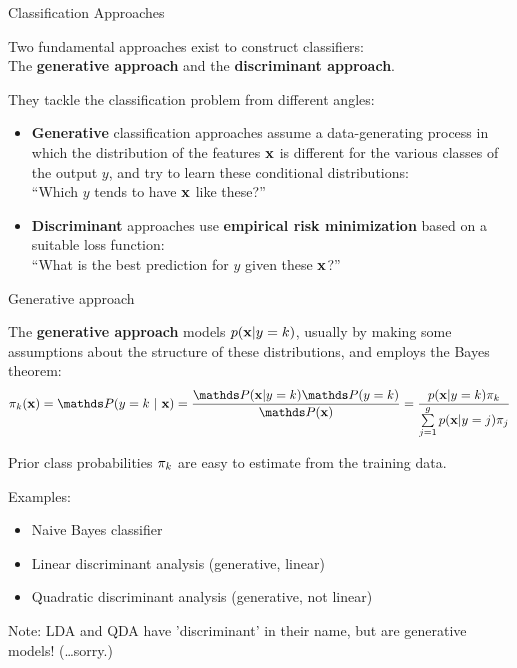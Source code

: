 \documentclass[11pt,compress,t,notes=noshow, xcolor=table]{beamer}
\begin{document}
\begin{vbframe}{Classification Approaches}

  Two fundamental approaches exist to construct classifiers:\\
  The \textbf{generative approach} and the \textbf{discriminant approach}.

\lz
They tackle the classification problem from different angles:

\begin{itemize}
\item \textbf{Generative} classification approaches assume a data-generating process in which the distribution of the features $\mathbf{x}$ is different for the various classes of the output $y$, and try to learn these conditional distributions:\\ \enquote{Which $y$ tends to have $\mathbf{x}$ like these?}
\lz
\item \textbf{Discriminant} approaches use \textbf{empirical risk minimization} based on a suitable loss function:\\ \enquote{What is the best prediction for $y$ given these $\mathbf{x}$?}
\end{itemize}
\end{vbframe}

\begin{vbframe}{Generative approach}

  The \textbf{generative approach}
  models $p(\mathbf{x} | y= k)$, usually by making some assumptions about the structure of these distributions, and employs the Bayes theorem:
  $$\pikx = \postk = \frac{\P(\xv | y = k) \P(y = k)}{\P(\xv)} = \frac{\pdfxyk \pik}{\sumjg \pdfxyk[j] \pi_j}$$


  Prior class probabilities $\pi_{k}$ are easy to estimate from the training data.

  \lz

  Examples:
  \begin{itemize}
  \item Naive Bayes classifier
  \item Linear discriminant analysis (generative, linear)
  \item Quadratic discriminant analysis (generative, not linear)
  \end{itemize}

{\small Note: LDA and QDA have 'discriminant' in their name, but are generative models! (\dots sorry.)}
\end{vbframe}
\end{document}
